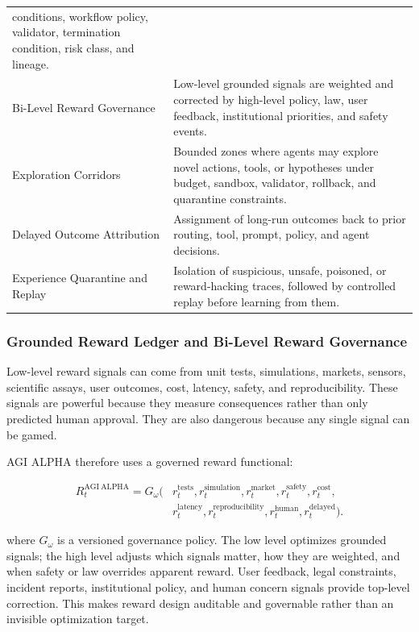 \documentclass[
  11pt,
]{article}
\begin{document}
\begin{longtable}[]{@{}
  >{\raggedright\arraybackslash}p{}
  >{\raggedright\arraybackslash}p{}@{}}
conditions, workflow policy, validator, termination condition, risk
class, and lineage. \\
Bi-Level Reward Governance & Low-level grounded signals are weighted and
corrected by high-level policy, law, user feedback, institutional
priorities, and safety events. \\
Exploration Corridors & Bounded zones where agents may explore novel
actions, tools, or hypotheses under budget, sandbox, validator,
rollback, and quarantine constraints. \\
Delayed Outcome Attribution & Assignment of long-run outcomes back to
prior routing, tool, prompt, policy, and agent decisions. \\
Experience Quarantine and Replay & Isolation of suspicious, unsafe,
poisoned, or reward-hacking traces, followed by controlled replay before
learning from them. \\
\end{longtable}

\subsubsection{Grounded Reward Ledger and Bi-Level Reward
Governance}\label{grounded-reward-ledger-and-bi-level-reward-governance}

Low-level reward signals can come from unit tests, simulations, markets,
sensors, scientific assays, user outcomes, cost, latency, safety, and
reproducibility. These signals are powerful because they measure
consequences rather than only predicted human approval. They are also
dangerous because any single signal can be gamed.

AGI ALPHA therefore uses a governed reward functional:

\[
\begin{aligned}
R_t^{\mathrm{AGI\ ALPHA}}=G_\omega\big(&r_t^{\mathrm{tests}},r_t^{\mathrm{simulation}},r_t^{\mathrm{market}},
 r_t^{\mathrm{safety}},r_t^{\mathrm{cost}},\\
&r_t^{\mathrm{latency}},r_t^{\mathrm{reproducibility}},r_t^{\mathrm{human}},
 r_t^{\mathrm{delayed}}\big).
\end{aligned}
\]

where \(G_\omega\) is a versioned governance policy. The low level
optimizes grounded signals; the high level adjusts which signals matter,
how they are weighted, and when safety or law overrides apparent reward.
User feedback, legal constraints, incident reports, institutional
policy, and human concern signals provide top-level correction. This
makes reward design auditable and governable rather than an invisible
optimization target.
\end{document}
